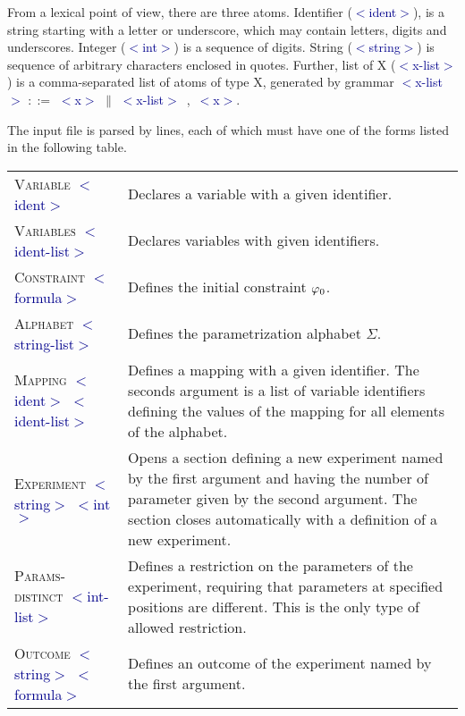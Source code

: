 \newcommand{\symb}[1]{\textcolor{DarkBlue}{$<$#1$>$}}
\newcommand{\txt}[1]{\;\textsc{#1}\;}
\newcommand{\term}[1]{\;\textrm{#1}\;}

From a lexical point of view, there are three atoms.
Identifier (\symb{ident}), is a string starting with a letter or underscore,
  which may contain letters, digits and underscores.
Integer (\symb{int}) is a sequence of digits.
String (\symb{string}) is sequence of arbitrary characters enclosed in quotes.
Further, list of X (\symb{x-list}) is a comma-separated list of atoms of type X,
  generated by grammar \symb{x-list} $::=$ \symb{x} $\|$ \symb{x-list}~,~\symb{x}.

The input file is parsed by lines, each of which must have one of the forms
  listed in the following table.

\begin{tabular}{|p{}|p{}|}
 \hline
\textsc{Variable} \symb{ident} &
    Declares a variable with a given identifier. \\
\textsc{Variables} \symb{ident-list} &
    Declares variables with given identifiers. \\
\textsc{Constraint} \symb{formula} &
    Defines the initial constraint $\varphi_0$. \\
\textsc{Alphabet} \symb{string-list} &
    Defines the parametrization alphabet $\Sigma$. \\
\textsc{Mapping} \symb{ident} \symb{ident-list} &
    Defines a mapping with a given identifier.
    The seconds argument is a list of variable identifiers defining
      the values of the mapping for all elements of the alphabet.    \\
\textsc{Experiment} \symb{string} \symb{int} &
    Opens a section defining a new experiment named by the first argument
      and having the number of parameter given by the second argument.
    The section closes automatically with a definition of a new experiment. \\
\textsc{Params-distinct} \symb{int-list} &
    Defines a restriction on the parameters of the experiment,
      requiring that parameters at specified positions are different.
    This is the only type of allowed restriction. \\
\textsc{Outcome} \symb{string} \symb{formula} &
    Defines an outcome of the experiment named by the first argument. \\ \hline
\end{tabular} \medskip

